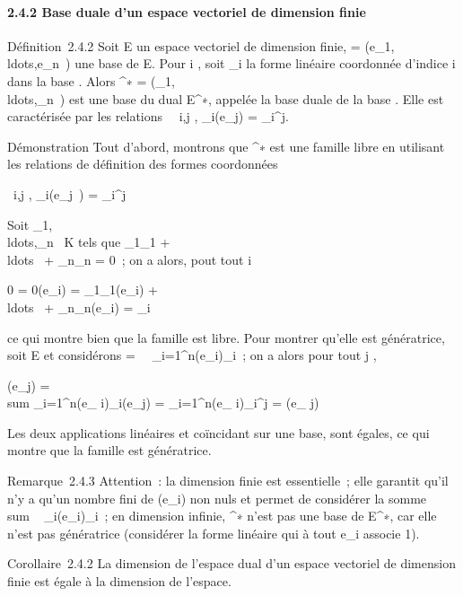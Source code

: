 \documentclass[]{article}
\begin{document}
\paragraph{2.4.2 Base duale d'un espace vectoriel de dimension finie}

Définition~2.4.2 Soit E un espace vectoriel de dimension finie,  =
(e_1,\\ldots,e_n~)
une base de E. Pour i \in [1,n], soit \phi_i la forme linéaire
coordonnée d'indice i dans la base . Alors ^∗ =
(\phi_1,\\ldots,\phi_n~)
est une base du dual E^∗, appelée la base duale de la base .
Elle est caractérisée par les relations \forall~~i,j \in
[1,n], \phi_i(e_j) = \delta_i^j.

Démonstration Tout d'abord, montrons que ^∗ est une famille
libre en utilisant les relations de définition des formes coordonnées

\forall~i,j \in [1,n], \phi_i(e_j~) =
\delta_i^j

Soit
\lambda_1,\\ldots,\lambda_n~
\in K tels que \lambda_1\phi_1 +
\\ldots~ +
\lambda_n\phi_n = 0~; on a alors, pout tout i \in [1,n]

0 = 0(e_i) = \lambda_1\phi_1(e_i) +
\\ldots~ +
\lambda_n\phi_n(e_i) = \lambda_i

ce qui montre bien que la famille est libre. Pour montrer qu'elle est
génératrice, soit \phi \in E et considérons \psi =\
\sum ~
_i=1^n\phi(e_i)\phi_i~; on a alors pour tout j
\in [1,n],

\psi(e_j) = \\sum
_i=1^n\phi(e_ i)\phi_i(e_j) =
\sum _i=1^n\phi(e_
i)\delta_i^j = \phi(e_ j)

Les deux applications linéaires \phi et \psi coïncidant sur une base, sont
égales, ce qui montre que la famille est génératrice.

Remarque~2.4.3 Attention~: la dimension finie est essentielle~; elle
garantit qu'il n'y a qu'un nombre fini de \phi(e_i) non nuls et
permet de considérer la somme
\\sum ~
_i\inI\phi(e_i)\phi_i~; en dimension infinie,
^∗ n'est pas une base de E^∗, car elle n'est pas
génératrice (considérer la forme linéaire \phi qui à tout e_i
associe 1).

Corollaire~2.4.2 La dimension de l'espace dual d'un espace vectoriel de
dimension finie est égale à la dimension de l'espace.
\end{document}
